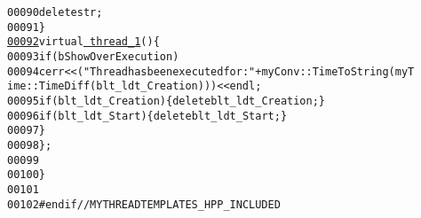 \begin{footnotesize}
\begin{alltt}
00090                 \textcolor{keyword}{delete} str;
00091         \}
\hypertarget{myThreadTemplates_8hpp_source_l00092}{}\hyperlink{classmyThreadTemplates_1_1thread__1_aab0cedc80707090ec300be40e68c19c1}{00092}         \textcolor{keyword}{virtual} \hyperlink{classmyThreadTemplates_1_1thread__1_aab0cedc80707090ec300be40e68c19c1}{~thread_1}()\{
00093                     \textcolor{keywordflow}{if} (bShowOverExecution)
00094                 cerr<<(\textcolor{stringliteral}{"Thread has been executed for: "}+ myConv::TimeToString(myT
      ime::TimeDiff(blt\_ldt\_Creation)))<<endl;
00095             \textcolor{keywordflow}{if} ( blt\_ldt\_Creation ) \{ \textcolor{keyword}{delete} blt\_ldt\_Creation; \}
00096             \textcolor{keywordflow}{if} ( blt\_ldt\_Start ) \{ \textcolor{keyword}{delete} blt\_ldt\_Start; \}
00097         \}
00098 \};
00099 
00100 \}
00101 
00102 \textcolor{preprocessor}{#endif // MYTHREADTEMPLATES\_HPP\_INCLUDED}
\end{alltt}\end{footnotesize}
